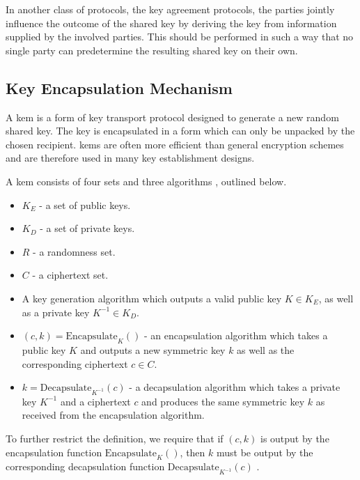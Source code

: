 In another class of protocols, the key agreement protocols, the parties jointly influence the outcome of the shared key by deriving the key from information supplied by the involved parties. This should be performed in such a way that no single party can predetermine the resulting shared key on their own\cite{boyd2020}.

\subsection{Key Encapsulation Mechanism}

A \gls{kem} is a form of key transport protocol designed to generate a new random shared key. The key is encapsulated in a form which can only be unpacked by the chosen recipient. \glspl{kem} are often more efficient than general encryption schemes and are therefore used in many key establishment designs\cite{boyd2020}.

A \gls{kem} consists of four sets and three algorithms \cite{boyd2020}, outlined below.

\begin{itemize}
    \item $K_E$ - a set of public keys.
    \item $K_D$ - a set of private keys.
    \item $R$ - a randomness set.
    \item $C$ - a ciphertext set.
\end{itemize}

\begin{itemize}
    \item A key generation algorithm which outputs a valid public key $K\in K_E$, as well as a private key $K^{-1}\in K_D$.
    \item $(c,k)=\text{Encapsulate}_K()$ - an encapsulation algorithm which takes a public key $K$ and outputs a new symmetric key $k$ as well as the corresponding ciphertext $c\in C$.
    \item $k=\text{Decapsulate}_{K^{-1}}(c)$ - a decapsulation algorithm which takes a private key $K^{-1}$ and a ciphertext $c$ and produces the same symmetric key $k$ as received from the encapsulation algorithm.
\end{itemize}

To further restrict the definition, we require that if $(c,k)$ is output by the encapsulation function $\text{Encapsulate}_K()$, then $k$ must be output by the corresponding decapsulation function $\text{Decapsulate}_{K^{-1}}(c)$ \cite{boyd2020}.

